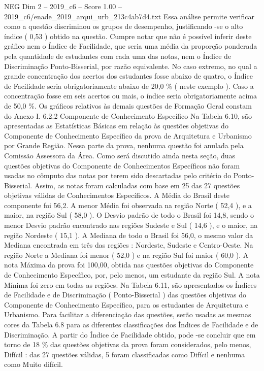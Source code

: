 \begin{textsample}{NEG Dim 2 – 2019\_c6 – Score 1.00 – 2019\_c6/enade\_2019\_arqui\_urb\_213c4ab7d4.txt}
Essa análise permite verificar como a questão discriminou os grupos de desempenho, justificando -se o alto índice ( 0,53 ) obtido na questão.
Cumpre notar que não é possível inferir deste gráfico nem o Índice de Facilidade, que seria uma média da proporção ponderada pela quantidade de estudantes com cada uma das notas, nem o Índice de Discriminação Ponto-Bisserial, por razão equivalente.
No caso extremo, no qual a grande concentração dos acertos dos estudantes fosse abaixo de quatro, o Índice de Facilidade seria obrigatoriamente abaixo de 20,0 \% ( neste exemplo ).
Caso a concentração fosse em seis acertos ou mais, o índice seria obrigatoriamente acima de 50,0 \%.
Os gráficos relativos às demais questões de Formação Geral constam do Anexo I. 6.2.2 Componente de Conhecimento Específico Na Tabela 6.10, são apresentadas as Estatísticas Básicas em relação às questões objetivas do Componente de Conhecimento Específico da prova de Arquitetura e Urbanismo por Grande Região.
Nessa parte da prova, nenhuma questão foi anulada pela Comissão Assessora da Área.
Como será discutido ainda nesta seção, duas questões objetivas do Componente de Conhecimentos Específicos não foram usadas no cômputo das notas por terem sido descartadas pelo critério do Ponto-Bisserial.
Assim, as notas foram calculadas com base em 25 das 27 questões objetivas válidas de Conhecimentos Específicos.
A Média do Brasil deste componente foi 56,2.
A menor Média foi observada na região Norte ( 52,4 ), e a maior, na região Sul ( 58,0 ).
O Desvio padrão de todo o Brasil foi 14,8, sendo o menor Desvio padrão encontrado nas regiões Sudeste e Sul ( 14,6 ), e o maior, na região Nordeste ( 15,1 ).
A Mediana de todo o Brasil foi 56,0, o mesmo valor da Mediana encontrada em três das regiões : Nordeste, Sudeste e Centro-Oeste.
Na região Norte a Mediana foi menor ( 52,0 ) e na região Sul foi maior ( 60,0 ).
A nota Máxima da prova foi 100,00, obtida nas questões objetivas do Componente de Conhecimento Específico, por, pelo menos, um estudante da região Sul.
A nota Mínima foi zero em todas as regiões.
Na Tabela 6.11, são apresentados os Índices de Facilidade e de Discriminação ( Ponto-Bisserial ) das questões objetivas do Componente de Conhecimento Específico, para os estudantes de Arquitetura e Urbanismo.
Para facilitar a diferenciação das questões, serão usadas as mesmas cores da Tabela 6.8 para as diferentes classificações dos Índices de Facilidade e de Discriminação.
A partir do Índice de Facilidade obtido, pode -se concluir que em torno de 18 \% das questões objetivas da prova foram considerados, pelo menos, Difícil : das 27 questões válidas, 5 foram classificadas como Difícil e nenhuma como Muito difícil.

\end{textsample}
